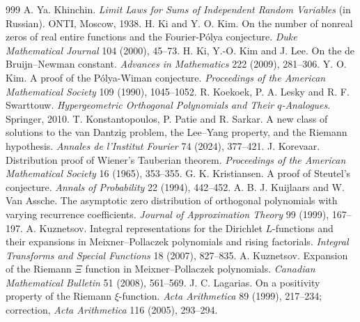 \begin{thebibliography}{999}
 A. Ya. Khinchin. \emph{Limit Laws for Sums of Independent Random Variables} (in Russian). ONTI, Moscow, 1938.
 H. Ki and Y. O. Kim. On the number of nonreal zeros of real entire functions and the Fourier-P\'olya conjecture. \emph{Duke Mathematical Journal} 104 (2000), 45--73.
 H. Ki, Y.-O. Kim and J. Lee. On the de Bruijn--Newman constant. \emph{Advances in Mathematics} 222 (2009), 281--306.
 Y. O. Kim. A proof of the P\'olya-Wiman conjecture. \emph{Proceedings of the American Mathematical Society} 109 (1990), 1045--1052.
 R. Koekoek, P. A. Lesky and R. F. Swarttouw. \emph{Hypergeometric Orthogonal Polynomials and Their $q$-Analogues}. Springer, 2010.
 T. Konstantopoulos, P. Patie and R. Sarkar. A new class of solutions to the van Dantzig problem, the Lee--Yang property, and the Riemann hypothesis. \emph{Annales de l'Institut Fourier} 74 (2024), 377--421.
 J. Korevaar. Distribution proof of Wiener's Tauberian theorem. \emph{Proceedings of the American Mathematical Society} 16 (1965), 353--355.
 G. K. Kristiansen. A proof of Steutel's conjecture. \emph{Annals of Probability} 22 (1994), 442--452.
 A. B. J. Kuijlaars and W. Van Assche. The asymptotic zero distribution of orthogonal polynomials with varying recurrence coefficients. \emph{Journal of Approximation Theory} 99 (1999), 167--197.
 A. Kuznetsov. Integral representations for the Dirichlet $L$-functions and their expansions in Meixner--Pollaczek polynomials and rising factorials. \emph{Integral Transforms and Special Functions} 18 (2007), 827--835.
 A. Kuznetsov. Expansion of the Riemann $\Xi$ function in Meixner--Pollaczek polynomials. \emph{Canadian Mathematical Bulletin} 51 (2008), 561--569.
 J. C. Lagarias. On a positivity property of the Riemann $\xi$-function. \emph{Acta Arithmetica} 89 (1999), 217--234; correction, \emph{Acta Arithmetica} 116 (2005), 293--294. %

\end{thebibliography}
